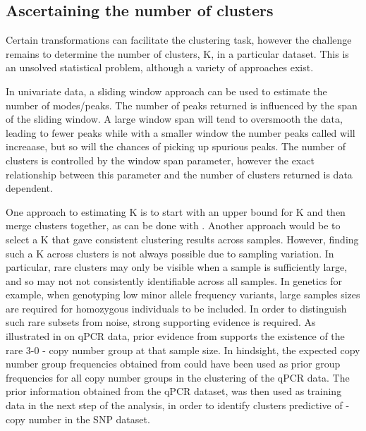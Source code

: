 \subsection{Ascertaining the number of clusters}


Certain transformations can facilitate the clustering task, however the challenge remains to determine the number of clusters, K, in a particular dataset.
This is an unsolved statistical problem, although a variety of approaches exist.

In univariate data, a sliding window approach can be used to estimate the number of modes/peaks.
The number of peaks returned is influenced by the span of the sliding window.
A large window span will tend to oversmooth the data, leading to fewer peaks while with a smaller window the number peaks called will increaase, but so will the chances of picking up spurious peaks.
The number of clusters is controlled by the window span parameter, however the exact relationship between this parameter and the number of clusters returned is data dependent.

One approach to estimating K is to start with an upper bound for K and then merge clusters together, as can be done with .
Another approach would be to select a K that gave consistent clustering results across samples.
However, finding such a K across clusters is not always possible due to sampling variation.
In particular, rare clusters may only be visible when a sample is sufficiently large, and so may not not consistently identifiable across all samples.
In genetics for example, when genotyping low minor allele frequency variants, large samples sizes are required for homozygous individuals to be included.
In order to distinguish such rare subsets from noise, strong supporting evidence is required.
As illustrated in  on qPCR data, prior evidence from \citet{Jiang:2012cf} supports the existence of the rare 3-0 - copy number group at that sample size.
In hindsight, the expected copy number group frequencies obtained from \citet{Jiang:2012cf} could have been used as prior group frequencies for all copy number groups in the clustering of the qPCR data.
The prior information obtained from the qPCR dataset, was then used as training data in the next step of the analysis, in order to identify clusters predictive of - copy number in the SNP dataset.

